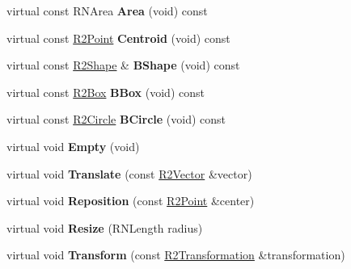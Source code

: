 \begin{DoxyCompactItemize}
\item 
virtual const R\+N\+Area {\bfseries Area} (void) const \hypertarget{class_r2_circle_af525d4666f72d6639a557a27dbcd6291}{}\label{class_r2_circle_af525d4666f72d6639a557a27dbcd6291}

\item 
virtual const \hyperlink{class_r2_point}{R2\+Point} {\bfseries Centroid} (void) const \hypertarget{class_r2_circle_a6fe0e1be39071b50a359ba15b20506b9}{}\label{class_r2_circle_a6fe0e1be39071b50a359ba15b20506b9}

\item 
virtual const \hyperlink{class_r2_shape}{R2\+Shape} \& {\bfseries B\+Shape} (void) const \hypertarget{class_r2_circle_a6fdf073a9287a40d2e8e60c770969058}{}\label{class_r2_circle_a6fdf073a9287a40d2e8e60c770969058}

\item 
virtual const \hyperlink{class_r2_box}{R2\+Box} {\bfseries B\+Box} (void) const \hypertarget{class_r2_circle_aeb34b85e7bf9f45bcf1212518923d4c1}{}\label{class_r2_circle_aeb34b85e7bf9f45bcf1212518923d4c1}

\item 
virtual const \hyperlink{class_r2_circle}{R2\+Circle} {\bfseries B\+Circle} (void) const \hypertarget{class_r2_circle_aaf4c33f4f8b70104eaf3a143c1ac9880}{}\label{class_r2_circle_aaf4c33f4f8b70104eaf3a143c1ac9880}

\item 
virtual void {\bfseries Empty} (void)\hypertarget{class_r2_circle_a9aa191a05ea0ffdd500352843b05e368}{}\label{class_r2_circle_a9aa191a05ea0ffdd500352843b05e368}

\item 
virtual void {\bfseries Translate} (const \hyperlink{class_r2_vector}{R2\+Vector} \&vector)\hypertarget{class_r2_circle_a5a091f4b06aec9de0f13212dceaf3d15}{}\label{class_r2_circle_a5a091f4b06aec9de0f13212dceaf3d15}

\item 
virtual void {\bfseries Reposition} (const \hyperlink{class_r2_point}{R2\+Point} \&center)\hypertarget{class_r2_circle_a2ae4307aa90802a994bb4170246e7df7}{}\label{class_r2_circle_a2ae4307aa90802a994bb4170246e7df7}

\item 
virtual void {\bfseries Resize} (R\+N\+Length radius)\hypertarget{class_r2_circle_ac702df9a2043341ac70dd70e20ed866b}{}\label{class_r2_circle_ac702df9a2043341ac70dd70e20ed866b}

\item 
virtual void {\bfseries Transform} (const \hyperlink{class_r2_transformation}{R2\+Transformation} \&transformation)\hypertarget{class_r2_circle_a23576ca788deaead79565a5fcf00d3c0}{}\label{class_r2_circle_a23576ca788deaead79565a5fcf00d3c0}


\end{DoxyCompactItemize}

